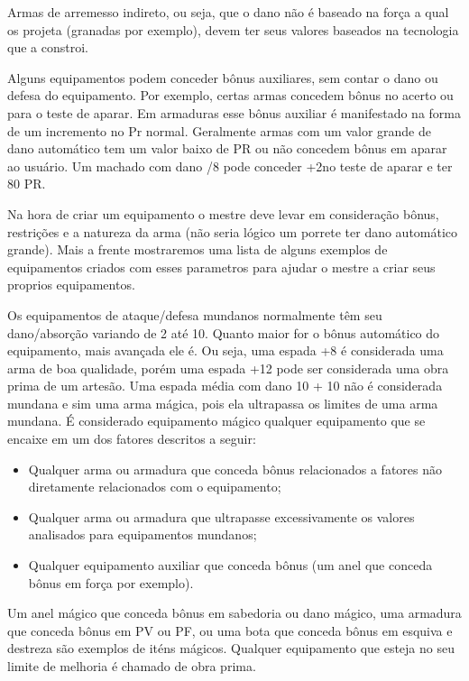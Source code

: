 Armas de arremesso indireto, ou seja, que o dano não é baseado na força a qual os projeta (granadas por exemplo), devem ter seus valores baseados na tecnologia que a constroi.

Alguns equipamentos podem conceder bônus auxiliares, sem contar o dano ou defesa do equipamento. Por exemplo, certas armas concedem bônus no acerto ou para o teste de aparar. Em armaduras esse bônus auxiliar é manifestado na forma de um incremento no Pr normal. Geralmente armas com um valor grande de dano automático tem um valor baixo de PR ou não concedem bônus em aparar ao usuário. Um machado com dano /8 pode conceder +2no teste de aparar e ter 80 PR.

Na hora de criar um equipamento o mestre deve levar em consideração bônus, restrições e a natureza da arma (não seria lógico um porrete ter dano automático grande). Mais a frente mostraremos uma lista de alguns exemplos de equipamentos criados com esses parametros para ajudar o mestre a criar seus proprios equipamentos.


Os equipamentos de ataque/defesa mundanos normalmente têm seu dano/absorção variando de 2 até 10. Quanto maior for o bônus automático do equipamento, mais avançada ele é. Ou seja, uma espada +8 é considerada uma arma de boa qualidade, porém uma espada +12 pode ser considerada uma obra prima de um artesão. Uma espada média com dano 10 + 10 não é considerada mundana e sim uma arma mágica, pois ela ultrapassa os limites de uma arma mundana. É considerado equipamento mágico qualquer equipamento que se encaixe em um dos fatores descritos a seguir:

\begin{itemize}
	\item Qualquer arma ou armadura que conceda bônus relacionados a fatores não diretamente relacionados com o equipamento; 
	\item Qualquer arma ou armadura que ultrapasse excessivamente os valores analisados para equipamentos mundanos;
	\item Qualquer equipamento auxiliar que conceda bônus (um anel que conceda bônus em força por exemplo).
\end{itemize}

Um anel mágico que conceda bônus em sabedoria ou dano mágico, uma armadura que conceda bônus em PV ou PF, ou uma bota que conceda bônus em esquiva e destreza são exemplos de iténs mágicos. Qualquer equipamento que esteja no seu limite de melhoria é chamado de obra prima.
	
